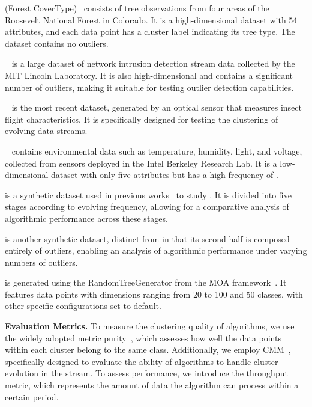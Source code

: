 \begin{myitemize}
    \item \textbf{\fct} (Forest CoverType)~\cite{Covertype} consists of tree observations from four areas of the Roosevelt National Forest in Colorado. It is a high-dimensional dataset with 54 attributes, and each data point has a cluster label indicating its tree type. The dataset contains no outliers.
    \item \textbf{\kdd}~\cite{KDD99} is a large dataset of network intrusion detection stream data collected by the MIT Lincoln Laboratory. It is also high-dimensional and contains a significant number of outliers, making it suitable for testing outlier detection capabilities.
    \item \textbf{\insect}~\cite{Insect} is the most recent dataset, generated by an optical sensor that measures insect flight characteristics. It is specifically designed for testing the clustering of evolving data streams.
    \item \textbf{\sensor}~\cite{SensorData} contains environmental data such as temperature, humidity, light, and voltage, collected from sensors deployed in the Intel Berkeley Research Lab. It is a low-dimensional dataset with only five attributes but has a high frequency of \cef.
    \item \textbf{\eds} is a synthetic dataset used in previous works~\cite{DenStream:06} to study \cef. It is divided into five stages according to evolving frequency, allowing for a comparative analysis of algorithmic performance across these stages.
    \item \textbf{\ods} is another synthetic dataset, distinct from \eds in that its second half is composed entirely of outliers, enabling an analysis of algorithmic performance under varying numbers of outliers.
    \item \textbf{\dimension} is generated using the RandomTreeGenerator from the MOA framework~\cite{MOA_Web}. It features data points with dimensions ranging from 20 to 100 and 50 classes, with other specific configurations set to default.
\end{myitemize}

\textbf{Evaluation Metrics.}
To measure the clustering quality of \dsc algorithms, we use the widely adopted metric purity~\cite{10.1145/1557019.1557115}, which assesses how well the data points within each cluster belong to the same class. Additionally, we employ CMM~\cite{CMM:2011}, specifically designed to evaluate the ability of \dsc algorithms to handle cluster evolution in the stream. To assess performance, we introduce the throughput metric, which represents the amount of data the algorithm can process within a certain period.

